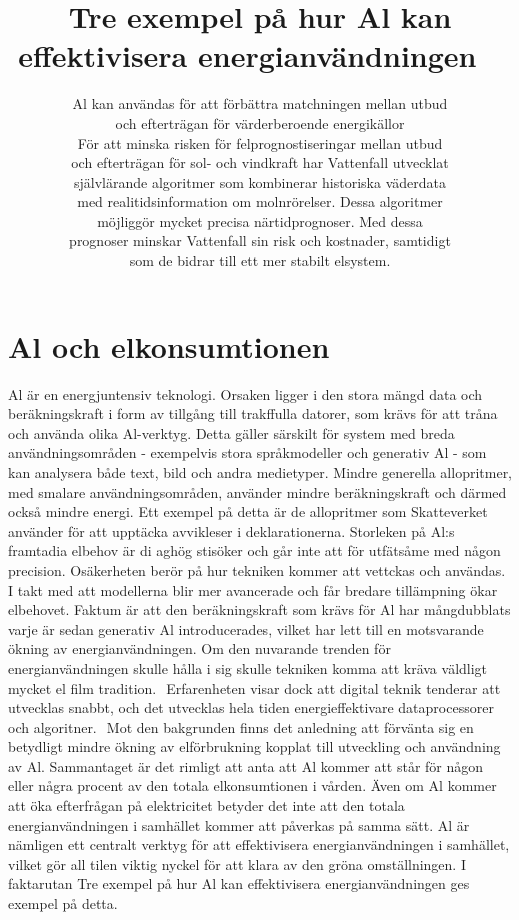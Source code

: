 {{{\section*{Al och elkonsumtionen}
Al är en energjuntensiv teknologi. Orsaken ligger i den stora mängd data och beräkningskraft i form av tillgång till trakffulla datorer, som krävs för att tråna och använda olika Al-verktyg. Detta gäller särskilt för system med breda användningsområden - exempelvis stora språkmodeller och generativ Al - som kan analysera både text, bild och andra medietyper. Mindre generella allopritmer, med smalare användningsområden, använder mindre beräkningskraft och därmed också mindre energi. Ett exempel på detta är de allopritmer som Skatteverket använder för att upptäcka avvikleser i deklarationerna.
Storleken på Al:s framtadia elbehov är di aghög stisöker och går inte att för utfätsåme med någon precision. Osäkerheten berör på hur tekniken kommer att vettckas och användas. I takt med att modellerna blir mer avancerade och får bredare tillämpning ökar elbehovet. Faktum är att den beräkningskraft som krävs för Al har mångdubblats varje är sedan generativ Al introducerades, vilket har lett till en motsvarande ökning av energianvändningen. Om den nuvarande
trenden för energianvändningen skulle hålla i sig skulle tekniken komma att kräva väldligt mycket el film tradition. \({ }^{}\) Erfarenheten visar dock att digital teknik tenderar att utvecklas snabbt, och det utvecklas hela tiden energieffektivare dataprocessorer och algoritner. \({ }^{}\) Mot den bakgrunden finns det anledning att förvänta sig en betydligt mindre ökning av elförbrukning kopplat till utveckling och användning av Al. Sammantaget är det rimligt att anta att Al kommer att står för någon eller några procent av den totala elkonsumtionen i vården.
Även om Al kommer att öka efterfrågan på elektricitet betyder det inte att den totala energianvändningen i samhället kommer att påverkas på samma sätt. Al är nämligen ett centralt verktyg för att effektivisera energianvändningen i samhället, vilket gör all tilen viktig nyckel för att klara av den gröna omställningen. I faktarutan Tre exempel på hur Al kan effektivisera energianvändningen ges exempel på detta.

\title{
Tre exempel på hur Al kan effektivisera energianvändningen \({ }^{\text { }}\)
}
\author{
Al kan användas för att förbättra matchningen mellan utbud \\ och efterträgan för värderberoende energikällor \\ För att minska risken för felprognostiseringar mellan utbud \\ och efterträgan för sol- och vindkraft har Vattenfall utvecklat \\ självlärande algoritmer som kombinerar historiska väderdata \\ med realitidsinformation om molnrörelser. Dessa algoritmer \\ möjliggör mycket precisa närtidprognoser. Med dessa \\ prognoser minskar Vattenfall sin risk och kostnader, samtidigt \\ som de bidrar till ett mer stabilt elsystem.
}
}}}
